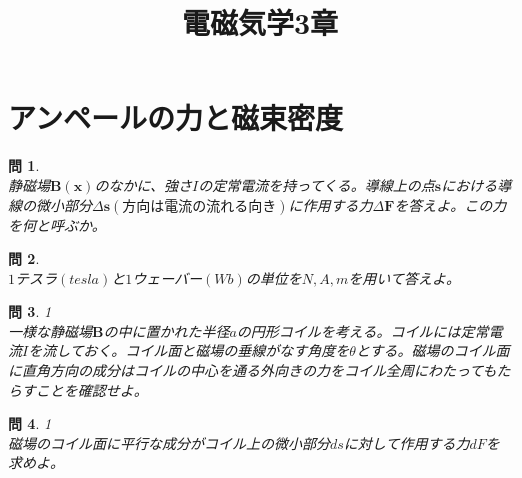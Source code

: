 \documentclass{jsarticle}
\title{電磁気学3章}
\author{}
\date{}
\newtheorem{pro}{問}[section]
\begin{document}
\maketitle
\noindent
\section{アンペールの力と磁束密度}
\noindent
\begin{pro}~\\
静磁場\(\bm{B}(\bm{x})\)のなかに、強さ\(I\)の定常電流を持ってくる。導線上の点\(\bm{s}\)における導線の微小部分\(\Delta\bm{s}(方向は電流の流れる向き)\)に作用する力\(\Delta\bm{F}\)を答えよ。この力を何と呼ぶか。
\end{pro}

\begin{pro}~\\
\(1\)テスラ\((tesla)\)と\(1\)ウェーバー\((Wb)\)の単位を\(N,A,m\)を用いて答えよ。
\end{pro}

\begin{pro}1\\
一様な静磁場\(\bm{B}\)の中に置かれた半径\(a\)の円形コイルを考える。コイルには定常電流\(I\)を流しておく。コイル面と磁場の垂線がなす角度を\(\theta\)とする。磁場のコイル面に直角方向の成分はコイルの中心を通る外向きの力をコイル全周にわたってもたらすことを確認せよ。\\
\end{pro}

\begin{pro}1\\
磁場のコイル面に平行な成分がコイル上の微小部分\(ds\)に対して作用する力\(dF\)を求めよ。
\end{pro}
\end{document}
